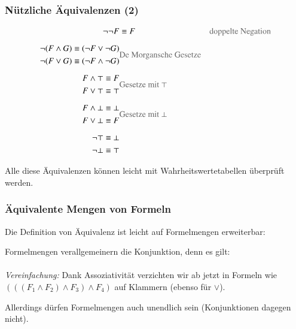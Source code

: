 \documentclass[aspectratio=1610,onlymath]{beamer}
\let\beameroriginaldoublebackslash\\
\let\\=\beameroriginaldoublebackslash
\begin{document}
\begin{frame}\frametitle{Nützliche Äquivalenzen (2)}

\begin{align*}
\neg\neg F &\equiv F
		& \text{\textcolor{devilscss}{doppelte Negation}}\\[1ex]
%
\begin{split}
\neg(F\wedge G) & \equiv (\neg F\vee \neg G)\\
\neg(F\vee G) & \equiv (\neg F\wedge \neg G)
\end{split}
		& \text{\textcolor{devilscss}{De Morgansche Gesetze}} \\[1ex]
%
\begin{split}
F\wedge \top & \equiv F\\
F\vee \top & \equiv \top
\end{split}
		& \text{\textcolor{devilscss}{Gesetze mit $\top$}}\\[1ex]
%
\begin{split}
F\wedge \bot & \equiv \bot\\
F\vee \bot & \equiv F
\end{split}
		& \text{\textcolor{devilscss}{Gesetze mit $\bot$}}\\[1ex]
%
\begin{split}
\neg\top & \equiv \bot\\
\neg\bot & \equiv \top
\end{split}
		& 
\end{align*}

Alle diese Äquivalenzen können leicht mit Wahrheitswertetabellen überprüft werden.

\end{frame}

\begin{frame}\frametitle{Äquivalente Mengen von Formeln}

Die Definition von Äquivalenz ist leicht auf Formelmengen erweiterbar:\medskip

\medskip\pause

Formelmengen verallgemeinern die Konjunktion, denn es gilt:\\[0.5ex]
%
\\[1ex]
%
\emph{Vereinfachung:} Dank Assoziativität verzichten wir ab jetzt in Formeln wie $(((F_1\wedge F_2)\wedge F_3)\wedge F_4)$
auf Klammern (ebenso für $\vee$).
\bigskip

Allerdings dürfen Formelmengen auch unendlich sein (Konjunktionen dagegen nicht).

\end{frame}
\end{document}
